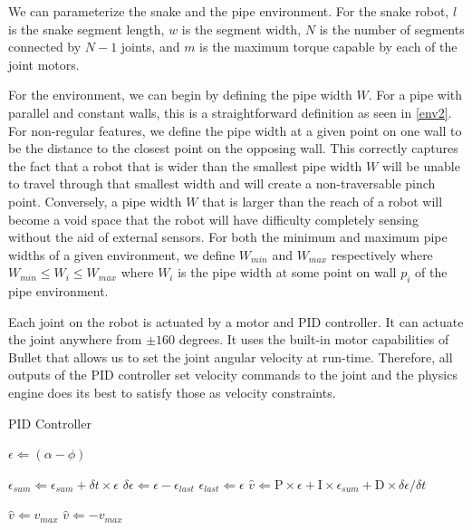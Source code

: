We can parameterize the snake and the pipe environment. For the snake robot, $l$ is the snake segment length, $w$ is the segment width, $N$ is the number of segments connected by $N-1$ joints, and $m$ is the maximum torque capable by each of the joint motors. 

 \cite{Vona:2010p391} 

For the environment, we can begin by defining the pipe width $W$. For a pipe with parallel and constant walls, this is a straightforward definition as seen in \autoref{env2}. For non-regular features, we define the pipe width at a given point on one wall to be the distance to the closest point on the opposing wall. This correctly captures the fact that a robot that is wider than the smallest pipe width $W$ will be unable to travel through that smallest width and will create a non-traversable pinch point. Conversely, a pipe width $W$ that is larger than the reach of a robot will become a void space that the robot will have difficulty completely sensing without the aid of external sensors. For both the minimum and maximum pipe widths of a given environment, we define $W_{min}$ and $W_{max}$ respectively where $W_{min} \leq W_i \leq W_{max}$ where $W_i$ is the pipe width at some point on wall $p_i$ of the pipe environment.

Each joint on the robot is actuated by a motor and PID controller. It can actuate the joint anywhere from $\pm160$ degrees. It uses the built-in motor capabilities of Bullet that allows us to set the joint angular velocity at run-time. Therefore, all outputs of the PID controller set velocity commands to the joint and the physics engine does its best to satisfy those as velocity constraints. 


\begin{algorithm}
\caption{PID Controller}          %
\label{alg1}
\begin{algorithmic}

\State $\epsilon \Leftarrow (\alpha - \phi)$


  \State $\epsilon_{sum} \Leftarrow \epsilon_{sum} + \delta t \times \epsilon$
  \State $\delta \epsilon \Leftarrow \epsilon-\epsilon_{last}$
  \State $\epsilon_{last} \Leftarrow \epsilon$
  \State $\hat{v} \Leftarrow \mathrm{P} \times \epsilon +\mathrm{I} \times \epsilon_{sum}+\mathrm{D} \times \delta \epsilon/\delta t$ 

    \State $\hat{v} \Leftarrow v_{max}$
  \EndIf
    \State $\hat{v} \Leftarrow -v_{max}$
  \EndIf


\EndIf

\end{algorithmic}
\end{algorithm}


